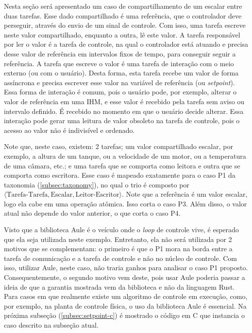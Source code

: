 Nesta seção será apresentado um caso de compartilhamento de um escalar entre duas tarefas. Esse dado compartilhado é uma referência, que o controlador deve perseguir, através do envio de um sinal de controle. Com isso, uma tarefa escreve neste valor compartilhado, enquanto a outra, lê este valor. A tarefa responsável por ler o valor é a tarefa de controle, na qual o controlador está atuando e precisa desse valor de referência em intervalos fixos de tempo, para conseguir seguir a referência. A tarefa que escreve o valor é uma tarefa de interação com o meio externo (ou com o usuário). Desta forma, esta tarefa recebe um valor de forma assíncrona e precisa escrever esse valor na variável de referência (ou \textit{setpoint}). Essa forma de interação é comum, pois o usuário pode, por exemplo, alterar o valor de referência em uma \ac{IHM}, e esse valor é recebido pela tarefa sem aviso ou intervalo definido. É recebido no momento em que o usuário decide alterar. Essa interação pode gerar uma leitura de valor obsoleto na tarefa de controle, pois o acesso ao valor não é indivisível e ordenado.

Note que, neste caso, existem: 2 tarefas; um valor compartilhado escalar, por exemplo, a altura de um tanque, ou a velocidade de um motor, ou a temperatura de uma câmara, etc.; e uma tarefa que se comporta como leitora e outra que se comporta como escritora. Esse caso é mapeado exatamente para o caso P1 da taxonomia (\ref{subsec:taxonomy}), no qual o trio é composto por $\langle \text{Tarefa-Tarefa},\text{Escalar},\text{Leitor-Escritor}\rangle$. Note que a referência é um valor escalar, logo ela cabe em uma operação atômica. Isso corta o caso P3. Além disso, o valor atual não depende do valor anterior, o que corta o caso P4.

Visto que a biblioteca Aule é o veículo onde o \textit{loop} de controle vive, é esperado que ela seja utilizada neste exemplo. Entretanto, ela não será utilizada por 2 motivos que se complementam: o primeiro é que o P1 mora na borda entre a tarefa de comunicação e a tarefa de controle e não no núcleo de controle. Com isso, utilizar Aule, neste caso, não traria ganhos para analisar o caso P1 proposto. Consequentemente, o segundo motivo vem deste, pois usar Aule poderia passar a ideia de que a garantia mostrada vem da biblioteca e não da linguagem Rust. Para casos em que realmente existe um algoritmo de controle em execução, como, por exemplo, na planta de controle física, o uso da biblioteca Aule é essencial. Na próxima subseção (\ref{subsec:setpoint-c}) é mostrado o código em C que instancia o caso descrito na subseção atual.

